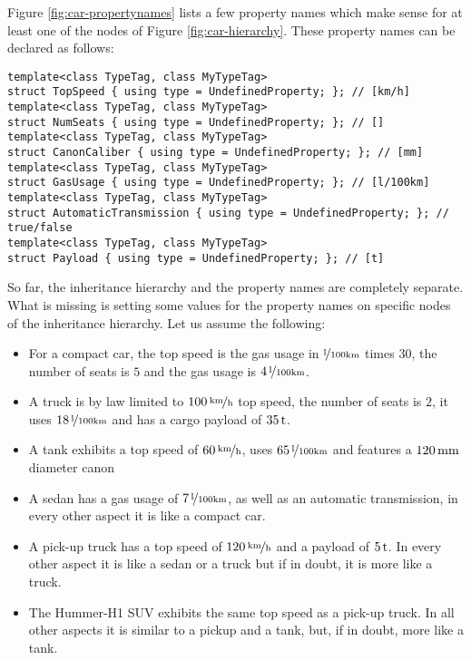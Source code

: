 Figure \ref{fig:car-propertynames} lists a few property names which
make sense for at least one of the nodes of Figure
\ref{fig:car-hierarchy}. These property names can be declared as
follows:
\begin{lstlisting}[name=propsyscars,style=DumuxCode]
template<class TypeTag, class MyTypeTag>
struct TopSpeed { using type = UndefinedProperty; }; // [km/h]
template<class TypeTag, class MyTypeTag>
struct NumSeats { using type = UndefinedProperty; }; // []
template<class TypeTag, class MyTypeTag>
struct CanonCaliber { using type = UndefinedProperty; }; // [mm]
template<class TypeTag, class MyTypeTag>
struct GasUsage { using type = UndefinedProperty; }; // [l/100km]
template<class TypeTag, class MyTypeTag>
struct AutomaticTransmission { using type = UndefinedProperty; }; // true/false
template<class TypeTag, class MyTypeTag>
struct Payload { using type = UndefinedProperty; }; // [t]
\end{lstlisting}

\noindent
So far, the inheritance hierarchy and the property names are completely
separate. What is missing is setting some values for the property
names on specific nodes of the inheritance hierarchy. Let us assume
the following:
\begin{itemize}
\item For a compact car, the top speed is the gas usage in $\unitfrac{l}{100km}$
  times $30$, the number of seats is $5$ and the gas usage is
  $\unitfrac[4]{l}{100km}$.
\item A truck is by law limited to $\unitfrac[100]{km}{h}$ top speed, the number
  of seats is $2$, it uses $\unitfrac[18]{l}{100km}$ and has a cargo payload of
  $\unit[35]{t}$.
\item A tank exhibits a top speed of $\unitfrac[60]{km}{h}$, uses $\unitfrac[65]{l}{100km}$
  and features a $\unit[120]{mm}$ diameter canon
\item A sedan has a gas usage of $\unitfrac[7]{l}{100km}$, as well as an automatic
  transmission, in every other aspect it is like a compact car.
\item A pick-up truck has a top speed of $\unitfrac[120]{km}{h}$ and a payload of
  $\unit[5]{t}$. In every other aspect it is like a sedan or a truck but if in
  doubt, it is more like a truck.
\item The Hummer-H1 SUV exhibits the same top speed as a pick-up
  truck.  In all other aspects it is similar to a pickup and a tank,
  but, if in doubt, more like a tank.
\end{itemize}

